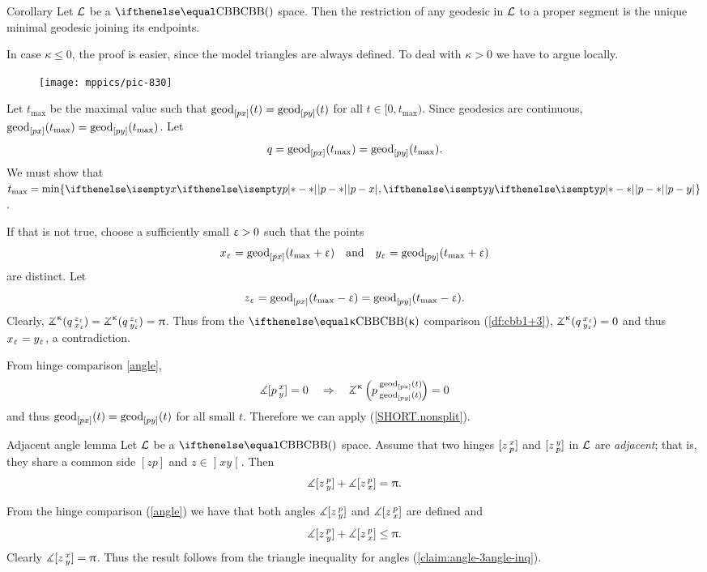 \begin{thm}{Corollary}\label{cor:unique-geod-cbb}
Let $\mathcal{L}$ be a $\Alex{}$ space.
Then the restriction of any geodesic in $\mathcal{L}$ to a proper segment is the unique minimal geodesic joining its endpoints.
\end{thm}

In case $\kappa\le 0$, the proof is easier, since the model triangles are always defined.
To deal with $\kappa>0$ we have to argue locally.

\begin{wrapfigure}{r}{25 mm}
\vskip-0mm
\centering
\texttt{[image: mppics/pic-830]}
\end{wrapfigure}

Let $t_{\max}$ be the maximal value 
such that $\mathrm{geod}_{[p x]}(t)=\mathrm{geod}_{[p y]}(t)$ for all $t\in [0,t_{\max})$.
Since geodesics are continuous, $\geod_{[p x]}(t_{\max})\z=\geod_{[p y]}(t_{\max})$.
Let
\[q=\geod_{[p x]}(t_{\max})\z=\geod_{[p y]}(t_{\max}).\]
We must show that $t_{\max}=\min\{\dist{p}{x}{},\dist{p}{y}{}\}$.

If that is not true, choose a sufficiently small $\upvarepsilon>0$ such that the  points
\[x_\upvarepsilon=\mathrm{geod}_{[p x]}(t_{\max}+\upvarepsilon)\quad 
\text{and}\quad  
  y_\upvarepsilon=\mathrm{geod}_{[p y]}(t_{\max}+\upvarepsilon)\] 
are distinct.
Let
\[z_\upvarepsilon=\mathrm{geod}_{[p x]}(t_{\max}-\upvarepsilon)
=\mathrm{geod}_{[p y]}(t_{\max}-\upvarepsilon).\]
Clearly, $\angk\kappa q{z_\eps}{x_\eps}=\angk\kappa q{z_\eps}{y_\eps}=\pi$.
Thus from the $\Alex\kappa$ comparison (\ref{df:cbb1+3}), $\angk\kappa q{x_\eps}{y_\eps}=0$ and thus $x_\upvarepsilon=y_\upvarepsilon$, a contradiction.

\parit{(\ref{SHORT.angle=0})} From hinge comparison \ref{angle}, 
\[\mangle\hinge p x y=0\quad \Rightarrow\quad \angkk\kappa p{\geod_{[p x]}(t)}{\geod_{[p y]}(t)}=0\] 
and thus ${\mathrm{geod}_{[p x]}(t)}={\mathrm{geod}_{[p y]}(t)}$ for all small $t$. 
Therefore we can apply (\ref{SHORT.nonsplit}).
\qeds

\begin{thm}{Adjacent angle lemma}\label{lem:sum=pi}
Let $\mathcal{L}$ be a $\Alex{}$ space.
Assume that two hinges $[z\,{}^{x}_{p}]$ and $[z\,{}^{y}_{p}]$ in $\mathcal{L}$ are \emph{adjacent}; that is, they share a common side $[zp]$ and $z\in\mathopen{]}xy\mathclose{[}$.
Then 
\[\measuredangle[z\,{}^{p}_{y}] + \measuredangle[z\,{}^{p}_{x}]=\uppi. \]

\end{thm}

From the hinge comparison (\ref{angle}) we have that both angles 
$\measuredangle[z\,{}^{p}_{y}]$ and $\measuredangle[z\,{}^{p}_{x}]$ are defined and 
\[\mangle\hinge z p y + \mangle\hinge z p x\le\pi.\]
Clearly $\measuredangle[z\,{}^{x}_{y}]=\uppi$.
Thus the result follows from the triangle inequality for angles (\ref{claim:angle-3angle-inq}).
\qeds


